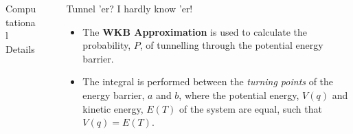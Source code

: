 \documentclass[final]{beamer}
\newlength{\sepwidth}
\newlength{\colwidth}
\newcommand{\separatorcolumn}{\begin{column}{\sepwidth}\end{column}}
\begin{document}
\begin{frame}[t]
\begin{columns}[t]
\begin{column}{\colwidth}
\begin{exampleblock}{Computational Details}
  \end{exampleblock}

\end{column}

\separatorcolumn

\begin{column}{\colwidth}

  \begin{block}{Tunnel 'er? I hardly know 'er!}

    \begin{itemize}
        \item The \textbf{WKB Approximation} is used to calculate the probability, $P$, of tunnelling through the potential energy barrier.         
        \item   The integral is performed between the \emph{turning points} of the energy barrier, $a$ and $b$, where the potential energy, $V(q)$ and kinetic energy, $E(T)$ of the system are equal, such that $V(q) = E(T)$. 
    \end{itemize}
    

\end{block}
\end{column}
\end{columns}
\end{frame}
\end{document}
